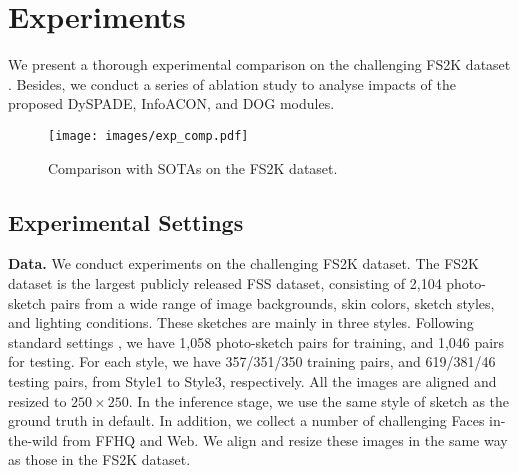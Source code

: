 \documentclass[10pt,twocolumn,letterpaper]{article}
\begin{document}
\section{Experiments}
\label{sec:exp}
We present a thorough experimental comparison on the challenging FS2K dataset \cite{Fan2021FS2K}. Besides, we conduct a series of ablation study to analyse impacts of the proposed DySPADE, InfoACON, and DOG modules. 



\begin{figure*}
	\centering
	\texttt{[image: images/exp\_comp.pdf]}
	\caption{Comparison with SOTAs on the FS2K dataset.}
	\label{fig:fs2k}
\end{figure*}

\subsection{Experimental Settings}
\label{ssec:exp_setting}

\textbf{Data.}
\label{ssec:exp_data}
We conduct experiments on the challenging FS2K dataset. The FS2K dataset is the largest publicly released FSS dataset, consisting of 2,104 photo-sketch pairs from a wide range of image backgrounds, skin colors, sketch styles, and lighting conditions. These sketches are mainly in three styles. Following standard settings \cite{Fan2021FS2K}, we have 1,058 photo-sketch pairs for training, and 1,046 pairs for testing. For each style, we have 357/351/350 training pairs, and 619/381/46 testing pairs, from Style1 to Style3, respectively. All the images are aligned and resized to $250 \times 250$. In the inference stage, we use the same style of sketch as the ground truth in default.  
In addition, we collect a number of challenging Faces in-the-wild from FFHQ \cite{Karras2018StyleGAN} and Web. We align and resize these images in the same way as those in the FS2K dataset. 

\end{document}
